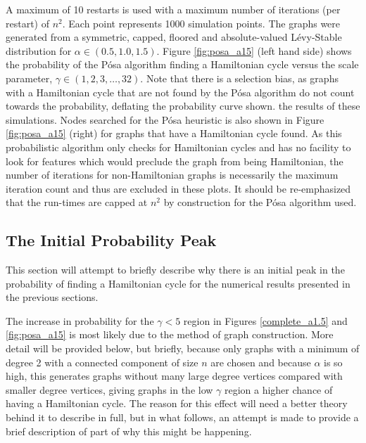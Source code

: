 \documentclass[twoside,11pt]{article}
\begin{document}
A maximum of 10 restarts is used with a maximum number of iterations (per restart) of $n^2$.  Each point represents 1000
simulation points.  The graphs were generated from a symmetric, capped, floored and absolute-valued L\'evy-Stable distribution for
$\alpha \in (0.5, 1.0, 1.5)$.
Figure \ref{fig:posa_a15} (left hand side) shows the probability of the P\'osa algorithm finding a Hamiltonian cycle versus the scale parameter, $\gamma \in (1, 2, 3, \dots, 32)$.
Note that there is a selection bias, as graphs with a Hamiltonian cycle that are not found by the P\'osa algorithm do not
count towards the probability, deflating the probability curve shown.
 the results of these simulations.
Nodes searched for the P\'osa heuristic is also shown in Figure \ref{fig:posa_a15} (right) for graphs that have a Hamiltonian cycle found.  As this probabilistic algorithm
only checks for Hamiltonian cycles and has no facility to look for features which would preclude the graph from being Hamiltonian, the
number of iterations for non-Hamiltonian graphs is necessarily the maximum iteration count and thus are excluded in these plots.
It should be re-emphasized that the run-times are capped at $n^2$ by construction for the P\'osa algorithm used.


\subsection{The Initial Probability Peak}

This section will attempt to briefly describe why there is an initial peak in the probability of finding
a Hamiltonian cycle for the numerical results presented in the previous sections.

The increase in probability for the $\gamma < 5$ region in Figures
 \ref{complete_a1.5} and \ref{fig:posa_a15} 
is most likely due to the method of graph construction.
More detail will be provided below, but briefly,
because only graphs
with a minimum of degree 2 with a connected component of size $n$ are chosen and because $\alpha$ is so high, this generates
graphs without many large degree vertices compared with smaller degree vertices, giving graphs in the low $\gamma$
region a higher chance of having a Hamiltonian cycle.  The reason for this effect will need a better theory behind it to describe
in full, but in what follows, an attempt is made to provide a brief description of part of why this might be happening.
\end{document}
